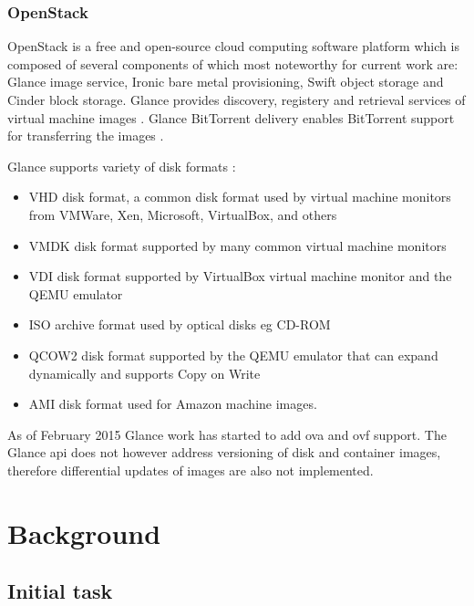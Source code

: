 \documentclass[a4paper,11pt]{kth-mag}
\begin{document}
\subsection{OpenStack}

OpenStack is a free and open-source cloud computing software platform
which is composed of several components of which most noteworthy for current work are:
Glance image service, Ironic bare metal provisioning,
Swift object storage and Cinder block storage.
Glance provides discovery, registery and retrieval services of virtual machine images
\cite{glance}.
Glance BitTorrent delivery enables BitTorrent support for transferring the images
\cite{glance-bittorrent-delivery}.

Glance supports variety of disk formats \cite{glance-formats}:

\begin{itemize}
\item VHD disk format, a common disk format used by virtual machine monitors from VMWare, Xen, Microsoft, VirtualBox, and others
\item VMDK disk format supported by many common virtual machine monitors
\item VDI disk format supported by VirtualBox virtual machine monitor and the QEMU emulator
\item ISO archive format used by optical disks eg CD-ROM
\item QCOW2 disk format supported by the QEMU emulator that can expand dynamically and supports Copy on Write
\item AMI disk format used for Amazon machine images.
\end{itemize}

\noindent

As of February 2015 Glance work has started to add
\acrfull{ova} and \acrfull{ovf}
\cite{ovas-and-ovfs-what-are-they-and-whats-the-difference}
support.
The Glance \acrshort{api} does not however address versioning
of disk and container images, therefore differential
updates of images are also not implemented.


%
%
%
%

\chapter{Background}
\label{chap:bgr}

\section{Initial task}
\end{document}
